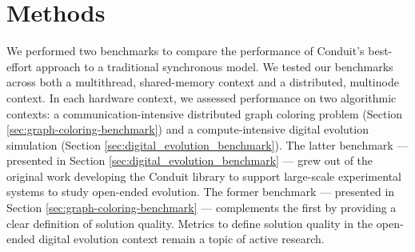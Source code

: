 
\section{Methods}

We performed two benchmarks to compare the performance of Conduit's best-effort approach to a traditional synchronous model.
We tested our benchmarks across both a multithread, shared-memory context and a distributed, multinode context.
In each hardware context, we assessed performance on two algorithmic contexts: a communication-intensive distributed graph coloring problem (Section \ref{sec:graph-coloring-benchmark}) and a compute-intensive digital evolution simulation (Section \ref{sec:digital_evolution_benchmark}).
The latter benchmark --- presented in Section \ref{sec:digital_evolution_benchmark} --- grew out of the original work developing the Conduit library to support large-scale experimental systems to study open-ended evolution.
The former benchmark --- presented in Section \ref{sec:graph-coloring-benchmark} --- complements the first by providing a clear definition of solution quality.
Metrics to define solution quality in the open-ended digital evolution context remain a topic of active research.












